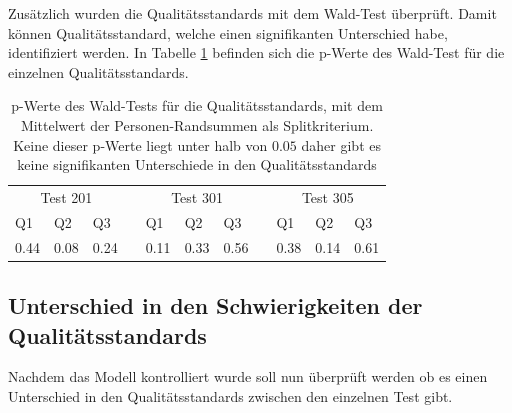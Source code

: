 Zusätzlich wurden die Qualitätsstandards mit dem Wald-Test überprüft. Damit können Qualitätsstandard, welche einen signifikanten Unterschied habe, identifiziert werden. In Tabelle \ref{tab:WaldTest} befinden sich die p-Werte des Wald-Test für die einzelnen Qualitätsstandards.

\begin{table}[htbp]
  \centering
\begin{tabular}{@{}lllllllllll@{}}
\toprule
 \multicolumn{3}{c}{Test 201} &&  \multicolumn{3}{c}{Test 301}&&  \multicolumn{3}{c}{Test 305}\\ 
    \cmidrule{1-3}\cmidrule{5-7}\cmidrule{9-11}
 Q1 & Q2 & Q3 && Q1 & Q2 & Q3 && Q1 & Q2 & Q3  \\ 
\midrule
  0.44 & 0.08 & 0.24 && 0.11 & 0.33 & 0.56 && 0.38 & 0.14 & 0.61   \\ 

\bottomrule
\end{tabular} 
  \caption{p-Werte des Wald-Tests für die Qualitätsstandards, mit dem Mittelwert der Personen-Randsummen als Splitkriterium. Keine dieser p-Werte liegt unter halb von $0.05$ daher gibt es keine signifikanten Unterschiede in den Qualitätsstandards }
  \label{tab:WaldTest}
\end{table}


\subsection{Unterschied in den Schwierigkeiten der Qualitätsstandards}

Nachdem das Modell kontrolliert wurde soll nun überprüft werden ob es einen Unterschied in den Qualitätsstandards zwischen den einzelnen Test gibt.



